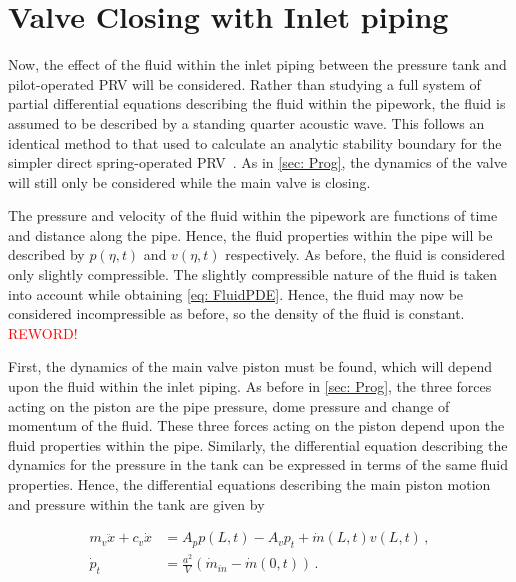 \chapter{Valve Closing with Inlet piping}

Now, the effect of the fluid within the inlet piping between the pressure tank and pilot-operated PRV will be considered.
Rather than studying a full system of partial differential equations describing the fluid within the pipework, the fluid is assumed to be described by a standing quarter acoustic wave.
This follows an identical method to that used to calculate an analytic stability boundary for the simpler direct spring-operated PRV~\cite{Hos2015ModelPipe,Hos2015DynamicModelling,Hos2016DynamicService,Hos2017DynamicRecommendations}. As in \cref{sec: Prog}, the dynamics of the valve will still only be considered while the main valve is closing.

The pressure and velocity of the fluid within the pipework are functions of time and distance along the pipe. Hence, the fluid properties within the pipe will be described by $p(\eta,t)$ and $v(\eta,t)$ respectively. As before, the fluid is considered only slightly compressible. The slightly compressible nature of the fluid is taken into account while obtaining \cref{eq: FluidPDE}. Hence, the fluid may now be considered incompressible as before, so the density of the fluid is constant. \textcolor{Red}{REWORD!}

First, the dynamics of the main valve piston must be found, which will depend upon the fluid within the inlet piping. As before in \cref{sec: Prog}, the three forces acting on the piston are the pipe pressure, dome pressure and change of momentum of the fluid. These three forces acting on the piston depend upon the fluid properties within the pipe. Similarly, the differential equation describing the dynamics for the pressure in the tank can be expressed in terms of the same fluid properties. Hence, the differential equations describing the main piston motion and pressure within the tank are given by

\begin{equation} \label{eq: ValveODEsPipe}
\begin{split}
    m_v \ddot{x} + c_v \dot{x} &= A_p p(L,t) - A_v p_t + \dot{m}(L,t)
    v(L,t) %
    \, , \\
    \dot{p}_t &= \frac{a^2}{V} \left( \dot{m}_{in} - \dot{m}(0,t) \right) \, .
\end{split}
\end{equation}

